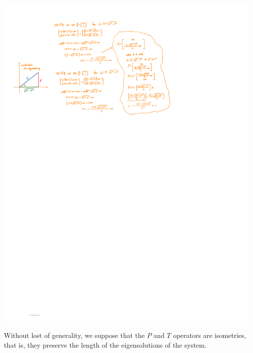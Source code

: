 \documentclass[1pt]{book}
\theoremstyle{break}
\theoremstyle{break}
\begin{document}
\begin{center}
\includegraphics[scale=2.5]{2x2Unborken.pdf}
\end{center}

\hfill\break
\hfill\break
\hfill\break
Without lost of generality, we suppose that the $P$ and $T$ operators are isometries, that is, they preserve the length of the eigensolutions of the system. 
\end{document}
